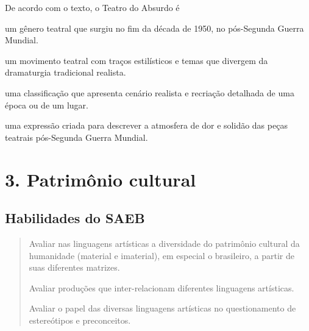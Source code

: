 De acordo com o texto, o Teatro do Absurdo é

\begin{escolha}
\item
  um gênero teatral que surgiu no fim da década de 1950, no pós-Segunda
  Guerra Mundial.
\item
  um movimento teatral com traços estilísticos e temas que divergem da
  dramaturgia tradicional realista.
\item
  uma classificação que apresenta cenário realista e recriação detalhada
  de uma época ou de um lugar.
\item
  uma expressão criada para descrever a atmosfera de dor e solidão das
  peças teatrais pós-Segunda Guerra Mundial.
\end{escolha}


\chapter{3. Patrimônio cultural}

\section{Habilidades do SAEB}

\begin{quote}
\item Avaliar nas linguagens artísticas a diversidade do patrimônio cultural
da humanidade (material e imaterial), em especial o brasileiro, a partir
de suas diferentes matrizes.
\item Avaliar produções que inter-relacionam diferentes linguagens
artísticas.
\item Avaliar o papel das diversas linguagens artísticas no questionamento
de estereótipos e preconceitos.
\end{quote}


